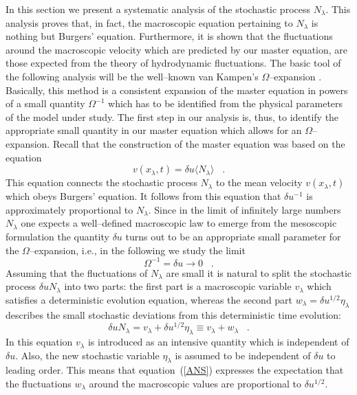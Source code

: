In this section we present a systematic analysis of the stochastic
process $N_{\lambda}$. This analysis proves that, in fact, the macroscopic
equation pertaining to $N_{\lambda}$ is nothing but Burgers' equation.
Furthermore, it is shown that the fluctuations around the macroscopic
velocity which are predicted by our master equation,
are those expected from the theory of hydrodynamic fluctuations.
The basic tool of the following analysis will be the
well--known van Kampen's $\Omega$--expansion \cite{KAMPEN}. Basically, this
method is a consistent expansion of the master equation in powers of
a small quantity $\Omega^{-1}$ which has to be identified from the
physical parameters of the model under study.
The first step in our analysis is, thus, to identify the appropriate small
quantity in our master equation which allows for an $\Omega$--expansion.
Recall that the construction of the master equation was based on the equation
\begin{equation}
v(x_{\lambda},t) = \delta u \langle N_{\lambda} \rangle \;\;\; .
\end{equation}
This equation connects the stochastic process $N_{\lambda}$ to the mean
velocity $v(x_{\lambda},t)$ which obeys Burgers' equation.
It follows from this equation that $\delta u^{-1}$ is approximately proportional
to $N_{\lambda}$. Since in the limit
of infinitely large numbers $N_{\lambda}$ one expects a well--defined macroscopic
law to emerge from the mesoscopic formulation
the quantity $\delta u$ turns out to be an appropriate
small parameter for the $\Omega$--expansion, i.e., in the following
we study the limit
\begin{equation}                                  \label{LIMIT}
\Omega^{-1} = \delta u \longrightarrow 0 \;\;\;   .
\end{equation}
Assuming that the fluctuations of $N_{\lambda}$ are small
it is natural to split the stochastic process $\delta u N_{\lambda}$ into two
parts: the first part is a macroscopic variable $v_{\lambda}$ which satisfies
a deterministic evolution equation, whereas the second part
$w_{\lambda}=\delta u^{1/2} \eta_{\lambda}$ describes the small stochastic
deviations from this deterministic time evolution:
\begin{equation}
\label{ANS}
\delta u N_{\lambda} = v_{\lambda} + \delta u^{1/2} \eta_{\lambda}
\equiv v_{\lambda} + w_{\lambda}
\;\;\; .
\end{equation}
In this equation $v_{\lambda}$ is introduced as an intensive quantity which
is independent of $\delta u$. Also, the new stochastic variable
$\eta_{\lambda}$ is assumed to be independent of
$\delta u$ to leading order. This means that equation~(\ref{ANS})
expresses the expectation that the fluctuations $w_{\lambda}$
around the macroscopic values
are proportional to $\delta u^{1/2}$.

